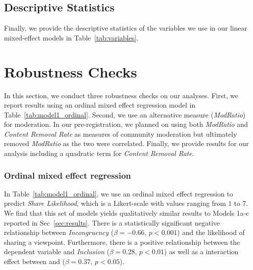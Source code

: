 \subsection{Descriptive Statistics}
Finally, we provide the descriptive statistics of the variables we use in our linear mixed-effect models in Table~\ref{tab:variables}.



\section{Robustness Checks}
\label{sec:robustness}
In this section, we conduct three robustness checks on our analyses. First, we report results using an ordinal mixed effect regression model in Table~\ref{tab:model1_ordinal}. Second, we use an alternative measure (\textit{ModRatio}) for moderation. In our pre-registration, we planned on using both \textit{ModRatio} and \textit{Content Removal Rate} as measures of community moderation but ultimately removed \textit{ModRatio} as the two were correlated. Finally, we provide results for our analysis including a quadratic term for \textit{Content Removal Rate}.

\subsubsection{Ordinal mixed effect regression}
In Table~\ref{tab:model1_ordinal}, we use an ordinal mixed effect regression to predict \textit{Share Likelihood}, which is a Likert-scale with values ranging from $1$ to $7$. We find that this set of models yields qualitatively similar results to Models 1a-c reported in Sec~\ref{sec:results}. There is a statistically significant negative relationship between \textit{Incongruency} ($\beta=-0.66$, $p<0.001$) and the likelihood of sharing a viewpoint. Furthermore, there is a positive relationship between the dependent variable and \textit{Inclusion} ($\beta=0.28$, $p<0.01$) as well as a interaction effect between  and  ($\beta = 0.37$, $p < 0.05$).

